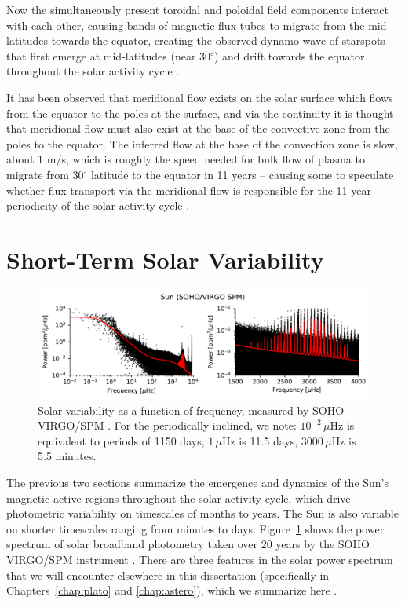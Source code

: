 Now the simultaneously present toroidal and poloidal field components interact with each other, causing bands of magnetic flux tubes to migrate from the mid-latitudes towards the equator, creating the observed dynamo wave of starspots that first emerge at mid-latitudes (near 30$^\circ$) and drift towards the equator throughout the solar activity cycle \citep{Parker1955a, Parker1955b, Babcock1961}. 

It has been observed that meridional flow exists on the solar surface which flows from the equator to the poles at the surface, and via the continuity it is thought that meridional flow must also exist at the base of the convective zone from the poles to the equator. The inferred flow at the base of the convection zone is slow, about 1 m/s, which is roughly the speed needed for bulk flow of plasma to migrate from 30$^\circ$ latitude to the equator in 11 years -- causing some to speculate whether flux transport via the meridional flow is responsible for the 11 year periodicity of the solar activity cycle \citep{Dikpati2006,Hathaway2010}. 

\section{Short-Term Solar Variability} \label{sec:shorttermvar}

\begin{figure}
\centering
\includegraphics[scale=0.8]{intro/sun.pdf}
\caption{Solar variability as a function of frequency, measured by SOHO VIRGO/SPM \citep{Frohlich1997}. For the periodically inclined, we note: $10^{-2} \,\mu$Hz is equivalent to periods of 1150 days,  $1\,\mu$Hz is 11.5 days, $3000\,\mu$Hz is 5.5 minutes.} \label{fig:virgospm}
\end{figure}

The previous two sections summarize the emergence and dynamics of the Sun's magnetic active regions throughout the solar activity cycle, which drive photometric variability on timescales of months to years. The Sun is also variable on shorter timescales ranging from minutes to days. Figure~\ref{fig:virgospm} shows the power spectrum of solar broadband photometry taken over 20 years by the SOHO VIRGO/SPM instrument \citep{Frohlich1997}. There are three features in the solar power spectrum that we will encounter elsewhere in this dissertation (specifically in Chapters~\ref{chap:plato} and \ref{chap:astero}), which we summarize here \citep[see review by][]{Nordlund2009}. 

